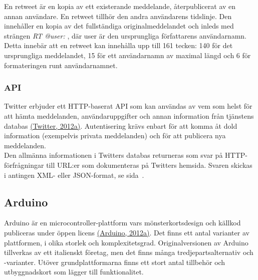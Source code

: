 \documentclass[a4paper,11pt]{article}
\begin{document}
En retweet är en kopia av ett existerande meddelande, återpublicerat av en annan användare. En retweet tillhör den andra användarens tidslinje. Den innehåller en kopia av det fullständiga originalmeddelandet och inleds med strängen {\it RT @user: }, där user är den ursprungliga författarens användarnamn. Detta innebär att en retweet kan innehålla upp till 161 tecken: 140 för det ursprungliga meddelandet, 15 för ett användarnamn av maximal längd och 6 för formateringen runt användarnamnet.

\subsubsection{API}
\label{twitterapi}
Twitter erbjuder ett HTTP-baserat API som kan användas av vem som helst för att hämta meddelanden, användaruppgifter och annan information från tjänstens databas \hyperref[twitter]{(Twitter, 2012a)}. Autentisering krävs enbart för att komma åt dold information (exempelvis privata meddelanden) och för att publicera nya meddelanden.\\

Den allmänna informationen i Twitters databas returneras som svar på HTTP-förfrågningar till URL:er som dokumenteras på Twitters hemsida. Svaren skickas i antingen XML- eller JSON-format, se sida~\pageref{json}.

\subsection{Arduino}
Arduino är en microcontroller-plattform vars mönsterkortsdesign och källkod publiceras under öppen licens \hyperref[arduino]{(Arduino, 2012a)}. Det finns ett antal varianter av plattformen, i olika storlek och komplexitetsgrad. Originalversionen av Arduino tillverkas av ett italienskt företag, men det finns många tredjepartsalternativ och -varianter. Utöver grundplattformarna finns ett stort antal tillbehör och utbyggnadskort som lägger till funktionalitet.\\
\end{document}

